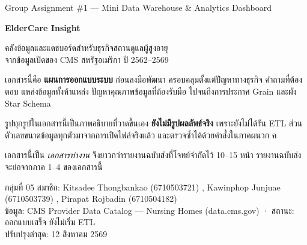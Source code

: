 \documentclass[11pt,a4paper]{article}
\newcommand{\sansall}{\sffamily}
\begin{document}
\begin{titlepage}
\thispagestyle{empty}

\vspace*{1.4cm}
{\sansall\color{muted}\small Group Assignment \#1 — Mini Data Warehouse \& Analytics Dashboard}

\vspace{0.9cm}
{\sansall\bfseries\fontsize{27}{33}\selectfont\color{src!90!black}
ElderCare Insight\par}

\vspace{0.5cm}
{\sansall\fontsize{13.5}{19}\selectfont\color{ink}
\vspace{\baselineskip}
\vspace{\baselineskip}
คลังข้อมูลและแดชบอร์ดสำหรับธุรกิจสถานดูแลผู้สูงอายุ\\
จากข้อมูลเปิดของ CMS สหรัฐอเมริกา ปี 2562--2569\par}

\vspace{3.0cm}

\begin{minipage}{0.66\textwidth}
เอกสารนี้คือ \textbf{แผนการออกแบบระบบ} ก่อนลงมือพัฒนา ครอบคลุมตั้งแต่ปัญหาทางธุรกิจ
คำถามที่ต้องตอบ แหล่งข้อมูลทั้งห้าแหล่ง ปัญหาคุณภาพข้อมูลที่ต้องรับมือ
ไปจนถึงการประกาศ Grain และผัง Star Schema

\vspace{0.6em}
รูปทุกรูปในเอกสารนี้เป็นภาพอธิบายที่วาดขึ้นเอง \textbf{ยังไม่มีรูปผลลัพธ์จริง}
เพราะยังไม่ได้รัน ETL ส่วนตัวเลขขนาดข้อมูลทุกตัวมาจากการเปิดไฟล์จริงแล้ว
และตรวจซ้ำได้ด้วยคำสั่งในภาคผนวก ค

\vspace{0.6em}
เอกสารนี้เป็น \emph{เอกสารทำงาน} จึงยาวกว่ารายงานฉบับส่งที่โจทย์จำกัดไว้ 10--15 หน้า
รายงานฉบับส่งจะย่อจากภาค 1--4 ของเอกสารนี้
\end{minipage}

\vfill
{}
\vspace{0.3em}

{\sansall\footnotesize\color{muted}
กลุ่มที่ 05 \quad สมาชิก:
Kitsadee Thongbankao (6710503721) ,
Kawinphop Junjuae (6710503739) ,
Pirapat Rojbadin (6710504182) \\
ข้อมูล: CMS Provider Data Catalog — Nursing Homes (data.cms.gov) ·
สถานะ: ออกแบบเสร็จ ยังไม่เริ่ม ETL \\
ปรับปรุงล่าสุด: 12 สิงหาคม 2569}
\end{titlepage}
\end{document}
